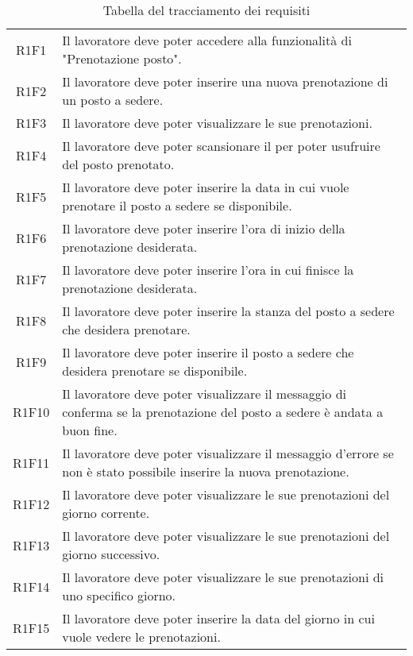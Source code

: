 \begin{table}[h]%
		\renewcommand{\arraystretch}{1.5}
	\centering
	\begin{tabularx}{\textwidth}{c X}
		\hline	
		\rowcolor{heavenly}
		\intest{Codice} &  \intest{Descrizione} \\	
		\hline			
		R1F1 & Il lavoratore deve poter accedere alla funzionalità di "Prenotazione posto".\\
		R1F2 & Il lavoratore deve poter inserire una nuova prenotazione di un posto a sedere.\\
		R1F3 & Il lavoratore deve poter visualizzare le sue prenotazioni.\\
		R1F4 & Il lavoratore deve poter scansionare il \g{QR code} per poter usufruire del posto prenotato.\\
		R1F5 & Il lavoratore deve poter inserire la data in cui vuole prenotare il posto a sedere se disponibile.\\
		R1F6 & Il lavoratore deve poter inserire l'ora di inizio della prenotazione desiderata.\\
		R1F7 & Il lavoratore deve poter inserire l'ora in cui finisce la prenotazione desiderata.\\
		R1F8 & Il lavoratore deve poter inserire la stanza del posto a sedere che desidera prenotare.\\
		R1F9 & Il lavoratore deve poter inserire il posto a sedere che desidera prenotare se disponibile.\\
		R1F10 & Il lavoratore deve poter visualizzare il messaggio di conferma se la prenotazione del posto a sedere è andata a buon fine.\\
		R1F11 & Il lavoratore deve poter visualizzare il messaggio d'errore se non è stato possibile inserire la nuova prenotazione.\\
		R1F12 & Il lavoratore deve poter visualizzare le sue prenotazioni del giorno corrente.\\
		R1F13 & Il lavoratore deve poter visualizzare le sue prenotazioni del giorno successivo.\\
		R1F14 & Il lavoratore deve poter visualizzare le sue prenotazioni di uno specifico giorno.\\
		R1F15 & Il lavoratore deve poter inserire la data del giorno in cui vuole vedere le prenotazioni.\\
		\hline	
	\end{tabularx} \hbox{}
	\caption{Tabella del tracciamento dei requisiti}
\end{table}%


